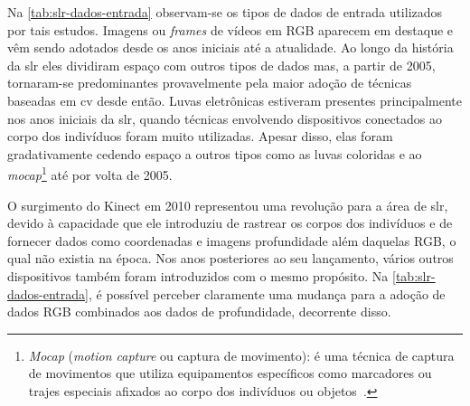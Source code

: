 
% 





Na \autoref{tab:slr-dados-entrada} observam-se os tipos de dados de entrada utilizados por tais estudos. Imagens ou \textit{frames} de vídeos em RGB aparecem em destaque e vêm sendo adotados desde os anos iniciais até a atualidade. Ao longo da história da \acrshort{slr} eles dividiram espaço com outros tipos de dados mas, a partir de 2005, tornaram-se predominantes provavelmente pela maior adoção de técnicas baseadas em \acrlong{cv} desde então.
Luvas eletrônicas estiveram presentes principalmente nos anos iniciais da \acrshort{slr}, quando técnicas envolvendo dispositivos conectados ao corpo dos indivíduos foram muito utilizadas.
Apesar disso, elas foram gradativamente cedendo espaço a outros tipos como as luvas coloridas e ao \textit{mocap}\footnote{
      \textit{Mocap} (\textit{motion capture} ou captura de movimento): é uma técnica de captura de movimentos que utiliza equipamentos específicos como marcadores ou trajes especiais afixados ao corpo dos indivíduos ou objetos~\cite{kitagawa-2017-mocap}.
} até por volta de 2005.

O surgimento do Kinect em 2010 representou uma revolução para a área de \acrshort{slr}, devido à capacidade que ele introduziu de rastrear os corpos dos indivíduos e de fornecer dados como coordenadas e imagens profundidade além daquelas RGB, o qual não  existia na época. Nos anos posteriores ao seu lançamento, vários outros dispositivos também foram introduzidos com o mesmo propósito.
Na \autoref{tab:slr-dados-entrada}, é possível perceber claramente uma mudança para a adoção de dados RGB combinados aos dados de profundidade, decorrente disso.


